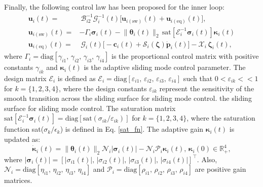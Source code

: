 \documentclass[lettersize,journal]{IEEEtran}
\begin{document}
Finally, the following control law has been proposed for the inner loop:
\begin{align} \label{control law for inner loop: equation}
    \boldsymbol{u}_i(t) =&~ \mathcal{B}_{i2}^{-1} \mathcal{G}_i^{-1}(t) \big[ \boldsymbol{u}_{i (\text{sw})}(t) + \boldsymbol{u}_{i (\text{eq})}(t) \big], \nonumber \\
    \boldsymbol{u}_{i (\text{sw})}(t) =& - \Gamma_i \boldsymbol{\sigma}_i(t) - \lVert \boldsymbol{\theta}_i(t) \rVert_2 \, \text{sat}[ \mathcal{E}_i^{-1}\boldsymbol{\sigma}_i(t)] \boldsymbol{\kappa}_i(t)\nonumber\\
    \boldsymbol{u}_{i (\text{eq})}(t) =&~\mathcal{G}_i(t)\big[- \boldsymbol{c}_i(t) + \mathcal{S}_i(\boldsymbol{\zeta}) \dot{\boldsymbol{p}}_i(t) \big] - \mathcal{X}_i\,\boldsymbol{\zeta}_i(t),
\end{align}
where $\Gamma_i = \text{diag}[\gamma_{i 1},\, \gamma_{i 2},\, \gamma_{i 3},\, \gamma_{i 4}]$  is the proportional control matrix with positive constants $\gamma_{i k}$ and $\boldsymbol{\kappa}_i(t)$ is the adaptive sliding mode control parameter.
The design matrix $\mathcal{E}_i$ is defined as $\mathcal{E}_i = \text{diag}[\varepsilon_{i 1}, \, \varepsilon_{i 2}, \, \varepsilon_{i 3}, \, \varepsilon_{i 4}]$ such that $0 < \varepsilon_{i k} << 1$ for $k = \{1, 2, 3, 4\}$, where the design constants $\varepsilon_{i k}$ represent the sensitivity of the smooth transition across the sliding surface for sliding mode control.
the sliding surface for sliding mode control.
The saturation matrix $\text{sat}[ \mathcal{E}_i^{-1}\boldsymbol{\sigma}_i(t)] = \text{diag}[\text{sat}(\sigma_{ik}/\varepsilon_{ik})]$ for $k = \{1, 2, 3, 4\}$, where the saturation function sat($\sigma_k/\epsilon_k$) is defined in Eq. \eqref{sat_fn}.
The adaptive gain $\boldsymbol{\kappa}_i(t)$ is updated as:
\begin{equation} \label{adaptive law for inner loop: equation}
    \dot{\boldsymbol{\kappa}}_i(t) =  \lVert \boldsymbol{\theta}_i(t) \rVert_2 \mathcal{N}_{i} \lvert \boldsymbol{\sigma}_i(t) \rvert - \mathcal{N}_{i} \mathcal{P}_{i} \boldsymbol{\kappa}_i(t), \, \boldsymbol{\kappa}_{i}(0) \in \mathbb{R}_+^4,
\end{equation}
where $\lvert \boldsymbol{\sigma}_i(t) \rvert  = \left[\lvert \sigma_{i 1}(t) \rvert,\, \lvert \sigma_{i 2}(t) \rvert,\, \lvert \sigma_{i 3}(t) \rvert,\, \lvert \sigma_{i 4}(t) \rvert\right]^{\top}$. Also, $\mathcal{N}_{i} = \text{diag}[\eta_{i 1},\, \eta_{i 2},\, \eta_{i 3},\, \eta_{i 4}]$ and $\mathcal{P}_{i} = \text{diag}[\rho_{i 1},\, \rho_{i 2},\, \rho_{i 3},\, \rho_{i 4}]$ are positive gain matrices.
\end{document}
